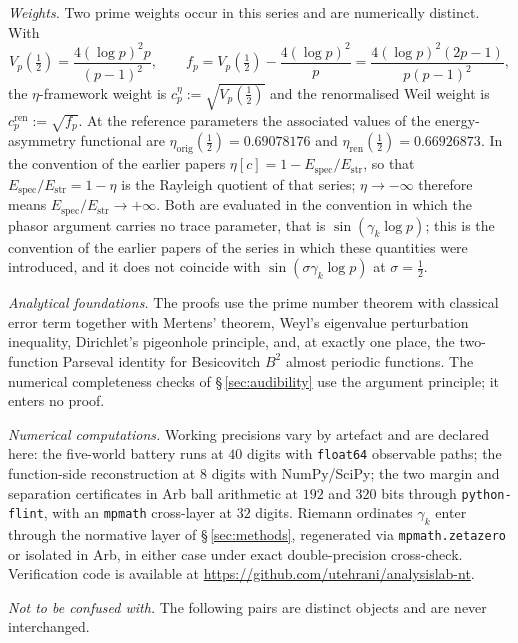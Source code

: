 \documentclass[11pt]{article}
\begin{document}
\medskip
\emph{Weights.}
Two prime weights occur in this series and are numerically distinct. With
\[
V_p(\tfrac12)=\frac{4(\log p)^2p}{(p-1)^2},
\qquad
f_p=V_p(\tfrac12)-\frac{4(\log p)^2}{p}=\frac{4(\log p)^2(2p-1)}{p(p-1)^2},
\]
the
$\eta$-framework weight is $c_p^{\eta}:=\sqrt{V_p(\tfrac12)}$ and the
renormalised Weil weight is $c_p^{\mathrm{ren}}:=\sqrt{f_p}$. At the reference
parameters the associated values of the energy-asymmetry functional are
$\eta_{\mathrm{orig}}(\tfrac12)=0.69078176$ and
$\eta_{\mathrm{ren}}(\tfrac12)=0.66926873$. In the convention of the earlier
papers $\eta[c]=1-E_{\mathrm{spec}}/E_{\mathrm{str}}$, so that
$E_{\mathrm{spec}}/E_{\mathrm{str}}=1-\eta$ is the Rayleigh quotient of that
series; $\eta\to-\infty$ therefore means
$E_{\mathrm{spec}}/E_{\mathrm{str}}\to+\infty$. Both are evaluated in the
convention in which the phasor argument carries no trace parameter, that is
$\sin(\gamma_k\log p)$; this is the convention of the earlier papers of the
series in which these quantities were introduced, and it does not coincide
with $\sin(\sigma\gamma_k\log p)$ at $\sigma=\tfrac12$.

\medskip
\emph{Analytical foundations.}
The proofs use the prime number theorem with classical error term together
with Mertens' theorem, Weyl's eigenvalue perturbation inequality, Dirichlet's
pigeonhole principle, and, at exactly one place, the two-function Parseval
identity for Besicovitch $B^2$ almost periodic functions. The numerical
completeness checks of \S\,\ref{sec:audibility} use the argument principle;
it enters no proof.

\medskip
\emph{Numerical computations.}
Working precisions vary by artefact and are declared here: the five-world
battery runs at $40$ digits with \texttt{float64} observable paths; the
function-side reconstruction at $8$ digits with NumPy/SciPy; the two margin
and separation certificates in Arb ball arithmetic at $192$ and $320$ bits
through \texttt{python-flint}, with an \texttt{mpmath} cross-layer at $32$
digits. Riemann ordinates $\gamma_k$ enter through the normative layer of
\S\,\ref{sec:methods}, regenerated via \texttt{mpmath.zetazero} or
isolated in Arb, in either case under exact double-precision cross-check. Verification code is
available at \url{https://github.com/utehrani/analysislab-nt}.

\medskip
\emph{Not to be confused with.}
The following pairs are distinct objects and are never interchanged.
\end{document}
